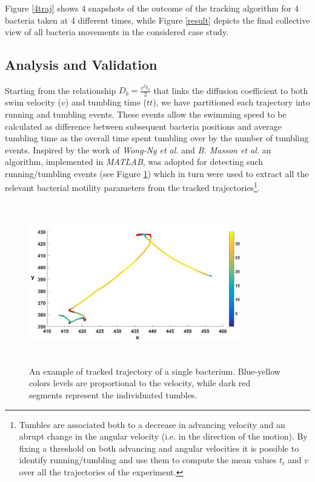 Figure \ref{4traj} shows 4 snapshots of the outcome of the tracking algorithm for 4 bacteria taken at 4 different times, while Figure \ref{result} depicts the final collective view of all bacteria movements in the considered case study. 


\subsection{Analysis and Validation}
Starting from the relationship $D_b=  \frac{v^2 t_t}{2}$  \cite{Berg:1993} that links the diffusion coefficient to both swim velocity ($v$) and tumbling time ($tt$), 
we have partitioned each trajectory into running and tumbling events. 
These events allow the swimming speed to be calculated as difference between subsequent bacteria positions and average tumbling time as the overall time spent tumbling over by the number of tumbling events. 
Inspired by the work of \textit{Wong-Ng et al.} \cite{Wong2016} and \textit{B. Masson et al.} \cite{Masson:2011} an algorithm, implemented in \textit{MATLAB}, was adopted for detecting such running/tumbling events (see Figure \ref{runtumbledetection})  which in turn were used to extract all the relevant bacterial motility parameters from the tracked trajectories\footnote{Tumbles are associated both to a decrease in advancing velocity and an abrupt change in the angular velocity (i.e. in the direction of the motion). By fixing a threshold on both advancing and angular velocities it is possible to identify running/tumbling and use them to compute the mean values $t_t$ and $v$ over all the trajectories of the experiment.}.
    \begin{figure}[htp]
         \includegraphics[width=9.3cm,height=7cm]{./images/bacteria/runtumble.png}
        \caption{An example of tracked trajectory of a single bacterium. Blue-yellow colors levels are proportional to the velocity, while dark red segments represent the individuated tumbles.}
        \label{runtumbledetection}
        \vspace{-1.5em}
    \end{figure}


